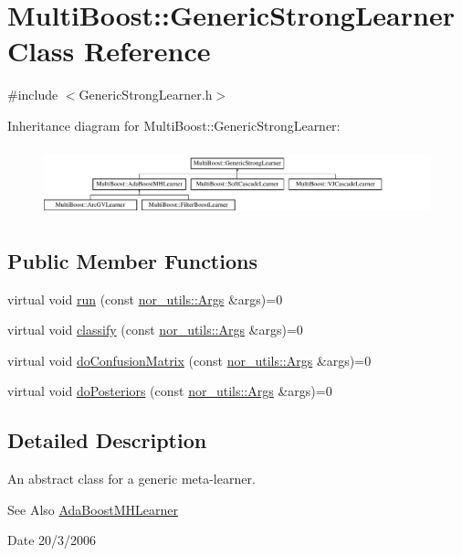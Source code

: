 \hypertarget{classMultiBoost_1_1GenericStrongLearner}{\section{Multi\-Boost\-:\-:Generic\-Strong\-Learner Class Reference}
\label{classMultiBoost_1_1GenericStrongLearner}
}


{\ttfamily \#include $<$Generic\-Strong\-Learner.\-h$>$}

Inheritance diagram for Multi\-Boost\-:\-:Generic\-Strong\-Learner\-:\begin{figure}[H]
\begin{center}
\leavevmode
\includegraphics[height=1.990521cm]{classMultiBoost_1_1GenericStrongLearner}
\end{center}
\end{figure}
\subsection*{Public Member Functions}
\begin{DoxyCompactItemize}
\item 
virtual void \hyperlink{classMultiBoost_1_1GenericStrongLearner_a77c75c5cbc867c191b327e5a04e9f147}{run} (const \hyperlink{classnor__utils_1_1Args}{nor\-\_\-utils\-::\-Args} \&args)=0
\item 
virtual void \hyperlink{classMultiBoost_1_1GenericStrongLearner_ad4b2a6aeca5917c841c5747f0bf81e90}{classify} (const \hyperlink{classnor__utils_1_1Args}{nor\-\_\-utils\-::\-Args} \&args)=0
\item 
virtual void \hyperlink{classMultiBoost_1_1GenericStrongLearner_a3b9a92fd37fe14cdc56c1b216b4d6889}{do\-Confusion\-Matrix} (const \hyperlink{classnor__utils_1_1Args}{nor\-\_\-utils\-::\-Args} \&args)=0
\item 
virtual void \hyperlink{classMultiBoost_1_1GenericStrongLearner_adf92c9fd773dab4e960dee744adf3654}{do\-Posteriors} (const \hyperlink{classnor__utils_1_1Args}{nor\-\_\-utils\-::\-Args} \&args)=0
\end{DoxyCompactItemize}


\subsection{Detailed Description}
An abstract class for a generic meta-\/learner. \begin{DoxySeeAlso}{See Also}
\hyperlink{classMultiBoost_1_1AdaBoostMHLearner}{Ada\-Boost\-M\-H\-Learner} 
\end{DoxySeeAlso}
\begin{DoxyDate}{Date}
20/3/2006 
\end{DoxyDate}


